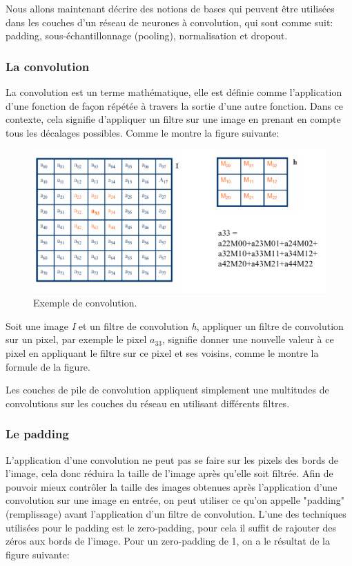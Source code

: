 	Nous allons maintenant décrire des notions de bases qui peuvent être utilisées dans les couches d'un réseau de neurones à convolution, qui sont comme suit: padding, sous-échantillonnage (pooling), normalisation et dropout.

\subsubsection{La convolution}
	
	La convolution est un terme mathématique, elle est définie comme l'application d'une fonction de façon répétée à travers la sortie d'une autre fonction. Dans ce contexte, cela signifie d'appliquer un filtre sur une image en prenant en compte tous les décalages possibles. Comme le montre la figure suivante:


\begin{figure}[H]
	\centering
		\includegraphics[width=5in]{Figures/convAouat.png}
	\caption[An Electron]{Exemple de convolution.}
	\label{fig:Electron}
\end{figure}

	Soit une image \textit{I} et un filtre de convolution \textit{h}, appliquer un filtre de convolution sur un pixel, par exemple le pixel \textit{$a_{33}$}, signifie donner une nouvelle valeur à ce pixel en appliquant le filtre sur ce pixel et ses voisins, comme le montre la formule de la figure.
	
	Les couches de pile de convolution appliquent simplement une multitudes de convolutions sur les couches du réseau en utilisant différents filtres.

\subsubsection{Le padding}

	L'application d'une convolution ne peut pas se faire sur les pixels des bords de l'image, cela donc réduira la taille de l'image après qu'elle soit filtrée. Afin de pouvoir mieux contrôler la taille des images obtenues après l'application d'une convolution sur une image en entrée, on peut utiliser ce qu'on appelle "padding" (remplissage) avant l'application d'un filtre de convolution.
	L'une des techniques utilisées pour le padding est le zero-padding, pour cela il suffit de rajouter des zéros aux bords de l'image. Pour un zero-padding de 1, on a le résultat de la figure suivante:

